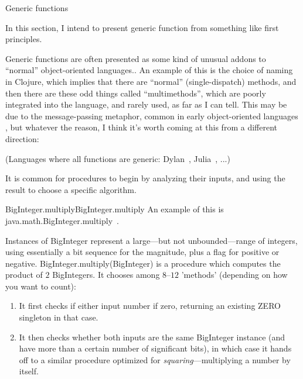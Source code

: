 \documentclass[12pt]{PalisadesLakesBook}
\begin{document}
\begin{plSection}{Generic functions} 

In this section, I intend to present generic function 
from something like first principles.

Generic functions are often presented as some kind of unusual 
addons to ``normal'' object-oriented languages..
An example of this is the choice of  naming in Clojure,
which implies that there are ``normal'' (single-dispatch)
methods, and then there are these odd things called 
``multimethods'', 
which are poorly integrated into the language,
and rarely used, as far as I can tell.
This may be due to the message-passing metaphor,
common in early object-oriented languages
\cite{GoldbergRobson:1983:Smalltalk80,
Krasner:1983:Smalltalk80History,
Goldberg:1984:Smalltalk80IPE},
but whatever the reason, 
I think it's worth coming at this from a different direction:

(Languages where all functions are generic: 
Dylan~\cite{ShalitPiazzaMoon:1992:Dylan}, 
Julia~\cite{Bezanson:2017:Julia}, ...)

It is common for procedures to begin by analyzing their inputs,
and using the result to choose a specific algorithm.

\begin{plExample}{{\javaFont BigInteger.multiply}}{BigInteger.multiply}
An example of this is 
{\javaFont 
java.math.BigInteger.multiply}~\cite{BigInteger.multiply:2021}.

Instances of {\javaFont BigInteger} represent a large---but not
unbounded---range of integers,
using essentially a bit sequence for the magnitude, 
plus a flag for positive or negative.
{\javaFont BigInteger.multiply(BigInteger)} 
is a procedure which computes the product of $2$ 
{\javaFont BigInteger}s.
It chooses among $8$--$12$ 'methods' (depending on how you want to
count):
\begin{enumerate}
  \item It first checks if either input number if zero,
returning an existing {\javaFont ZERO} singleton in that case.

\item It then checks whether both inputs are the same 
{\javaFont BigInteger} instance (and have more 
than a certain number of significant bits),
in which case it hands off to a similar  procedure optimized
for \textit{squaring}---multiplying  a number by itself.


\end{enumerate}
\end{plExample}
\end{plSection}
\end{document}
